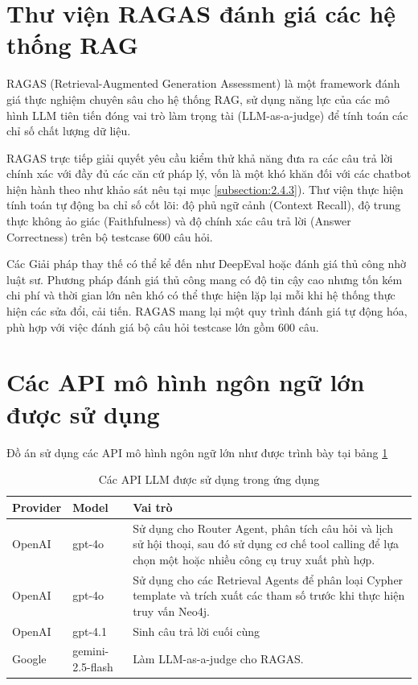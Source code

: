 \documentclass[../DoAn.tex]{subfiles}
\begin{document}
\section{Thư viện RAGAS đánh giá các hệ thống RAG}
\label{section:3.5}


RAGAS (Retrieval-Augmented Generation Assessment) \cite{RAGASDoc} là một framework đánh giá thực nghiệm chuyên sâu cho hệ thống RAG, sử dụng năng lực của các mô hình LLM tiên tiến đóng vai trò làm trọng tài (LLM-as-a-judge) để tính toán các chỉ số chất lượng dữ liệu.




RAGAS trực tiếp giải quyết yêu cầu kiểm thử khả năng đưa ra các câu trả lời chính xác với đầy đủ các căn cứ pháp lý, vốn là một khó khăn đối với các chatbot hiện hành theo như khảo sát nêu tại mục \ref{subsection:2.4.3}). Thư viện thực hiện tính toán tự động ba chỉ số cốt lõi: độ phủ ngữ cảnh (Context Recall), độ trung thực không ảo giác (Faithfulness) và độ chính xác câu trả lời (Answer Correctness) trên bộ testcase 600 câu hỏi.


Các Giải pháp thay thế có thể kể đến như DeepEval hoặc đánh giá thủ công nhờ luật sư. Phương pháp đánh giá thủ công mang có độ tin cậy cao nhưng tốn kém chi phí và thời gian lớn nên khó có thể thực hiện lặp lại mỗi khi hệ thống thực hiện các sửa đổi, cải tiến. RAGAS mang lại một quy trình đánh giá tự động hóa, phù hợp với việc đánh giá bộ câu hỏi testcase lớn gồm 600 câu.


\section{Các API mô hình ngôn ngữ lớn được sử dụng}
\label{section:3.7}


Đồ án sử dụng các API mô hình ngôn ngữ lớn như được trình bày tại bảng \ref{table:llm-api}


\begin{table}[H]
\centering
\caption{Các API LLM được sử dụng trong ứng dụng}
\label{table:llm-api}
\begin{tabular}{|p{2.7cm}|p{3.0cm}|p{8.0cm}|}
\hline
\textbf{Provider} & \textbf{Model} & \textbf{Vai trò} \\ \hline
OpenAI & gpt-4o& Sử dụng cho Router Agent, phân tích câu hỏi và lịch sử hội thoại, sau đó sử dụng cơ chế tool calling để lựa chọn một hoặc nhiều công cụ truy xuất phù hợp. \\ \hline
OpenAI & gpt-4o& Sử dụng cho các Retrieval Agents để phân loại Cypher template và trích xuất các tham số trước khi thực hiện truy vấn Neo4j. \\ \hline
OpenAI & gpt-4.1 & Sinh câu trả lời cuối cùng \\ \hline
Google & gemini-2.5-flash & Làm LLM-as-a-judge cho RAGAS. \\ \hline
\end{tabular}
\end{table}
\end{document}
